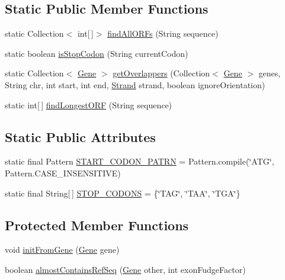 \subsection*{Static Public Member Functions}
\begin{DoxyCompactItemize}
\item 
static Collection$<$ int\mbox{[}$\,$\mbox{]}$>$ \hyperlink{classumms_1_1core_1_1annotation_1_1_gene_ab46b94429c37fa1d439ad495a19c9fbc}{find\+All\+O\+R\+Fs} (String sequence)
\item 
static boolean \hyperlink{classumms_1_1core_1_1annotation_1_1_gene_a58800b7ac03f5205cb858c171beb7d28}{is\+Stop\+Codon} (String current\+Codon)
\item 
static Collection$<$ \hyperlink{classumms_1_1core_1_1annotation_1_1_gene}{Gene} $>$ \hyperlink{classumms_1_1core_1_1annotation_1_1_gene_ae68cc738e565b9a1c21516d756e760dc}{get\+Overlappers} (Collection$<$ \hyperlink{classumms_1_1core_1_1annotation_1_1_gene}{Gene} $>$ genes, String chr, int start, int end, \hyperlink{enumumms_1_1core_1_1annotation_1_1_annotation_1_1_strand}{Strand} strand, boolean ignore\+Orientation)
\item 
static int\mbox{[}$\,$\mbox{]} \hyperlink{classumms_1_1core_1_1annotation_1_1_gene_a38b065832fc0ad12732919dc9877991a}{find\+Longest\+O\+R\+F} (String sequence)
\end{DoxyCompactItemize}
\subsection*{Static Public Attributes}
\begin{DoxyCompactItemize}
\item 
static final Pattern \hyperlink{classumms_1_1core_1_1annotation_1_1_gene_a40234c09d1097c20589ddc5c90b0945d}{S\+T\+A\+R\+T\+\_\+\+C\+O\+D\+O\+N\+\_\+\+P\+A\+T\+R\+N} = Pattern.\+compile(\char`\"{}A\+T\+G\char`\"{}, Pattern.\+C\+A\+S\+E\+\_\+\+I\+N\+S\+E\+N\+S\+I\+T\+I\+V\+E)
\item 
static final String\mbox{[}$\,$\mbox{]} \hyperlink{classumms_1_1core_1_1annotation_1_1_gene_a4f6beedb7f869c3aac74594c74463f3c}{S\+T\+O\+P\+\_\+\+C\+O\+D\+O\+N\+S} = \{\char`\"{}T\+A\+G\char`\"{}, \char`\"{}T\+A\+A\char`\"{}, \char`\"{}T\+G\+A\char`\"{}\}
\end{DoxyCompactItemize}
\subsection*{Protected Member Functions}
\begin{DoxyCompactItemize}
\item 
void \hyperlink{classumms_1_1core_1_1annotation_1_1_gene_af73381bf71c4a4a752ff80f5f985bb28}{init\+From\+Gene} (\hyperlink{classumms_1_1core_1_1annotation_1_1_gene}{Gene} gene)
\item 
boolean \hyperlink{classumms_1_1core_1_1annotation_1_1_gene_abbfc2629a07591f9831f2ffee16473aa}{almost\+Contains\+Ref\+Seq} (\hyperlink{classumms_1_1core_1_1annotation_1_1_gene}{Gene} other, int exon\+Fudge\+Factor)
\end{DoxyCompactItemize}
